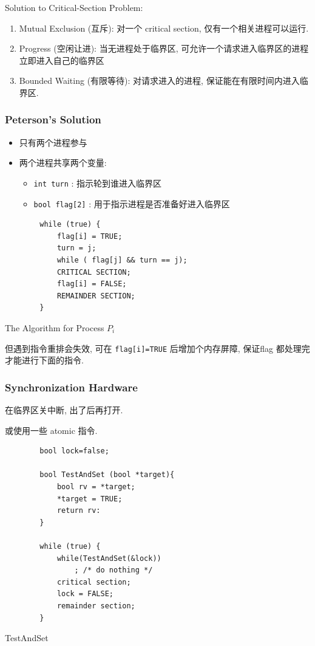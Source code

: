 Solution to Critical-Section Problem: 
\begin{enumerate}
    \item Mutual Exclusion (互斥): 对一个 critical section, 仅有一个相关进程可以运行. 
    \item Progress (空闲让进): 当无进程处于临界区, 可允许一个请求进入临界区的进程立即进入自己的临界区
    \item Bounded Waiting (有限等待): 对请求进入的进程, 保证能在有限时间内进入临界区. 
\end{enumerate}

\subsubsection{Peterson's Solution}
\begin{itemize}
    \item 只有两个进程参与
    \item 两个进程共享两个变量: 
    \begin{itemize}
        \item \texttt{int turn} : 指示轮到谁进入临界区
        \item \texttt{bool flag[2]} : 用于指示进程是否准备好进入临界区
    \end{itemize}
\end{itemize}

\begin{code}
    \centering
    \begin{verbatim}
        while (true) {
            flag[i] = TRUE;
            turn = j;
            while ( flag[j] && turn == j);
            CRITICAL SECTION;
            flag[i] = FALSE;
            REMAINDER SECTION;
        }
    \end{verbatim}
    \caption{The Algorithm for Process $P_i$}
\end{code}
但遇到指令重排会失效, 可在 \texttt{flag[i]=TRUE}   后增加个内存屏障, 保证flag 都处理完才能进行下面的指令. 
\subsubsection{Synchronization Hardware}
在临界区关中断, 出了后再打开.

或使用一些 atomic 指令. 

\begin{code}
    \begin{verbatim}
        bool lock=false;

        bool TestAndSet (bool *target){
            bool rv = *target;
            *target = TRUE;
            return rv:
        }

        while (true) {
            while(TestAndSet(&lock))
                ; /* do nothing */
            critical section;
            lock = FALSE;
            remainder section;
        }
    \end{verbatim}
    \caption{TestAndSet}
\end{code}

